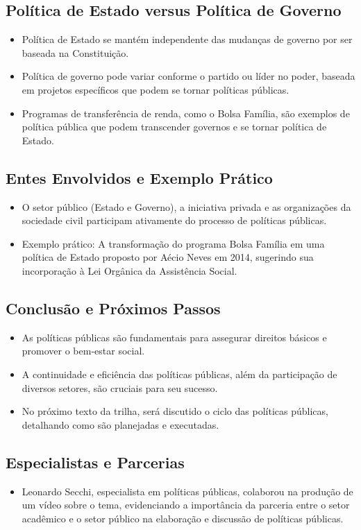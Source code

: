 \documentclass[
   article,       
   12pt,          
   oneside,       
   a4paper,       
   english,       
   brazil,        
   sumario=tradicional
   ]{abntex2}
\begin{document}
\subsection{Política de Estado versus Política de Governo}
\begin{itemize}
    \item Política de Estado se mantém independente das mudanças de governo por ser baseada na Constituição.
    \item Política de governo pode variar conforme o partido ou líder no poder, baseada em projetos específicos que podem se tornar políticas públicas.
    \item Programas de transferência de renda, como o Bolsa Família, são exemplos de política pública que podem transcender governos e se tornar política de Estado.
\end{itemize}

\subsection{Entes Envolvidos e Exemplo Prático}
\begin{itemize}
    \item O setor público (Estado e Governo), a iniciativa privada e as organizações da sociedade civil participam ativamente do processo de políticas públicas.
    \item Exemplo prático: A transformação do programa Bolsa Família em uma política de Estado proposto por Aécio Neves em 2014, sugerindo sua incorporação à Lei Orgânica da Assistência Social.
\end{itemize}

\subsection{Conclusão e Próximos Passos}
\begin{itemize}
    \item As políticas públicas são fundamentais para assegurar direitos básicos e promover o bem-estar social.
    \item A continuidade e eficiência das políticas públicas, além da participação de diversos setores, são cruciais para seu sucesso.
    \item No próximo texto da trilha, será discutido o ciclo das políticas públicas, detalhando como são planejadas e executadas.
\end{itemize}

\subsection{Especialistas e Parcerias}
\begin{itemize}
    \item Leonardo Secchi, especialista em políticas públicas, colaborou na produção de um vídeo sobre o tema, evidenciando a importância da parceria entre o setor acadêmico e o setor público na elaboração e discussão de políticas públicas.
\end{itemize}
\end{document}
